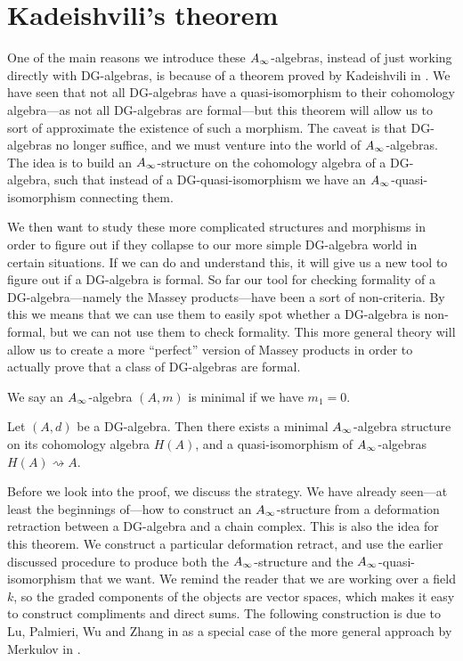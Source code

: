 

\section{Kadeishvili's theorem}

One of the main reasons we introduce these $A_{\infty}$-algebras, instead of just working directly with DG-algebras, is because of a theorem proved by Kadeishvili in \cite{kadeishvili}. We have seen that not all DG-algebras have a quasi-isomorphism to their cohomology algebra---as not all DG-algebras are formal---but this theorem will allow us to sort of approximate the existence of such a morphism. The caveat is that DG-algebras no longer suffice, and we must venture into the world of $A_{\infty}$-algebras. The idea is to build an $A_{\infty}$-structure on the cohomology algebra of a DG-algebra, such that instead of a DG-quasi-isomorphism we have an $A_{\infty}$-quasi-isomorphism connecting them. 

We then want to study these more complicated structures and morphisms in order to figure out if they collapse to our more simple DG-algebra world in certain situations. If we can do and understand this, it will give us a new tool to figure out if a DG-algebra is formal. So far our tool for checking formality of a DG-algebra---namely the Massey products---have been a sort of non-criteria. By this we means that we can use them to easily spot whether a DG-algebra is non-formal, but we can not use them to check formality. This more general theory will allow us to create a more ``perfect'' version of Massey products in order to actually prove that a class of DG-algebras are formal. 

\begin{definition}
\label{def:minimal_A_infinity-algebra}
We say an $A_{\infty}$-algebra $(A, m)$ is minimal if we have $m_1 = 0$. 
\end{definition}

\begin{theorem}
\label{thm:Kadeishvilis_theorem}
Let $(A,d)$ be a DG-algebra. Then there exists a minimal $A_{\infty}$-algebra structure on its cohomology algebra $H(A)$, and a quasi-isomorphism of $A_{\infty}$-algebras $H(A)\rightsquigarrow A$. 
\end{theorem}

Before we look into the proof, we discuss the strategy. We have already seen---at least the beginnings of---how to construct an $A_{\infty}$-structure from a deformation retraction between a DG-algebra and a chain complex. This is also the idea for this theorem. We construct a particular deformation retract, and use the earlier discussed procedure to produce both the $A_{\infty}$-structure and the $A_{\infty}$-quasi-isomorphism that we want. We remind the reader that we are working over a field $k$, so the graded components of the objects are vector spaces, which makes it easy to construct compliments and direct sums. The following construction is due to Lu, Palmieri, Wu and Zhang in \cite{Ext} as a special case of the more general approach by Merkulov in \cite{Merkulov}. 

